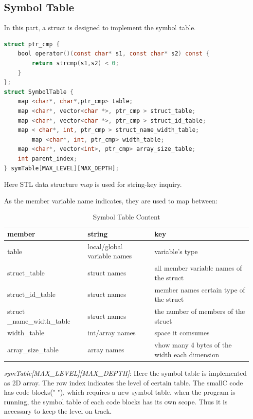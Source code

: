 \documentclass{article}
\begin{document}
\subsection{Symbol Table}
In this part, a struct is designed to implement the symbol table. 
\begin{lstlisting}[language = C] 
struct ptr_cmp {
	bool operator()(const char* s1, const char* s2) const {
		return strcmp(s1,s2) < 0;
	}
};
struct SymbolTable {
	map <char*, char*,ptr_cmp> table;
	map <char*, vector<char *>, ptr_cmp > struct_table;
	map <char*, vector<char *>, ptr_cmp > struct_id_table;
	map < char*, int, ptr_cmp > struct_name_width_table;
        map <char*, int, ptr_cmp> width_table; 
	map <char*, vector<int>, ptr_cmp> array_size_table;
	int parent_index;
} symTable[MAX_LEVEL][MAX_DEPTH];
\end{lstlisting}
Here STL data structure \textit{map} is used for string-key inquiry. 

As the member variable name indicates, they are used to map between:

\begin{table}[!hbp]
    \begin{tabular}{|l|l|l|}
\hline
    member                       & string & key                                                    \\ 
\hline
    table                       & local/global variable names & variable's type                                                    \\ \hline
    struct\_table               & struct names                & all member variable names of the struct            \\ \hline
    struct\_id\_table           & struct names                & member names certain type of the struct \\ \hline
    struct \_name\_width\_table & struct names                & the number of members of the struct                                \\ \hline
    width\_table                & int/array names             & space it comsumes                                                  \\ \hline
    array\_size\_table          & array names                 & vhow many 4 bytes of the width each dimension \\ \hline
    \end{tabular}
    \caption{Symbol Table Content}
\end{table}

\textit{symTable[MAX\_LEVEL][MAX\_DEPTH]}: Here the symbol table is implemented as 2D array. The row index indicates the level of certain table. The smallC code has code blocks("{ }"), which requires a new symbol table. when the program is running, the symbol table of each code blocks has its own scope. Thus it is necessary to keep the level on track. 
\end{document}

